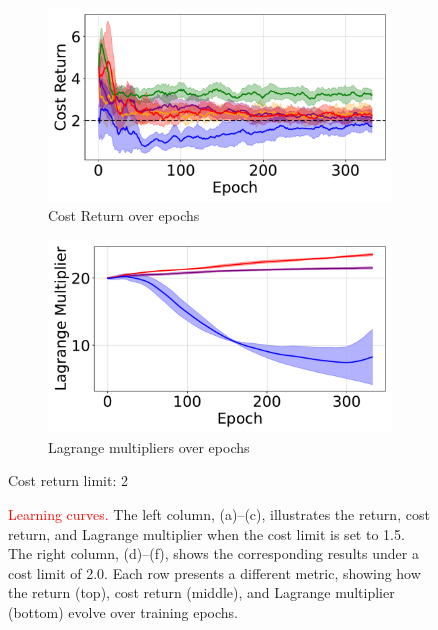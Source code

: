 \begin{figure}[H]
\begin{minipage}{0.48\textwidth}
        \begin{subfigure}{\linewidth}
            \centering
            \includegraphics[width=\linewidth]{figure/PointGoal/limit 2/EpCost.pdf}
            \caption{Cost Return over epochs}
        \end{subfigure}

        \begin{subfigure}{\linewidth}
            \centering
            \includegraphics[width=\linewidth]{figure/PointGoal/limit 2/lagrange.pdf}
            \caption{Lagrange multipliers over epochs}
        \end{subfigure}

        \caption*{Cost return limit: 2}
    \end{minipage}

    \caption{\textcolor{red}{Learning curves.} 
            The left column, (a)–(c), illustrates the return, cost return, and Lagrange multiplier when the cost limit is set to 1.5. 
            The right column, (d)–(f), shows the corresponding results under a cost limit of 2.0. 
            Each row presents a different metric, showing how the return (top), cost return (middle), and Lagrange multiplier (bottom) evolve over training epochs.}
    \label{fig:point_goal_results_vertical2}
\end{figure}

